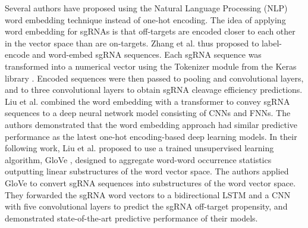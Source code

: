 \documentclass[unnumsec,webpdf,contemporary,large]{oup-authoring-template}
\theoremstyle{thmstyleone}%
\theoremstyle{thmstyletwo}%
\theoremstyle{thmstylethree}%
\begin{document}
Several authors have proposed using the Natural Language Processing (NLP) word embedding technique instead of one-hot encoding. The idea of applying word embedding for sgRNAs is that off-targets are encoded closer to each other in the vector space than are on-targets. Zhang et al. \cite{zhang2021prediction} thus proposed to label-encode and word-embed sgRNA sequences. Each sgRNA sequence was transformed into a numerical vector using the Tokenizer module from the Keras library \citep{chollet2015keras}. Encoded sequences were then passed to pooling and convolutional layers, and to three convolutional layers to obtain sgRNA cleavage efficiency predictions. Liu et al. \cite{liu2019prediction} combined the word embedding with a transformer to convey sgRNA sequences to a deep neural network model consisting of CNNs and FNNs. The authors demonstrated that the word embedding approach had similar predictive performance as the latest one-hot encoding-based deep learning models. In their following work, Liu et al. \cite{liu2020deep} proposed to use a trained unsupervised learning algorithm, GloVe \citep{pennington2014glove}, designed to aggregate word-word occurrence statistics outputting linear substructures of the word vector space. The authors applied GloVe to convert sgRNA sequences into substructures of the word vector space. They forwarded the sgRNA word vectors to a bidirectional LSTM and a CNN with five convolutional layers to predict the sgRNA off-target propensity, and demonstrated state-of-the-art predictive performance of their models.

\end{document}
